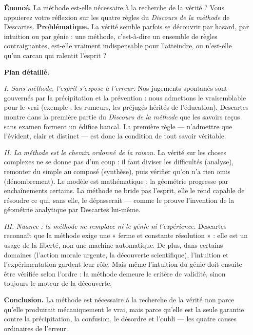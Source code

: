 \documentclass[11pt]{article}
\begin{document}
\begin{exoresolu}
\textbf{Énoncé.} La méthode est-elle nécessaire à la recherche de la vérité ? Vous appuierez votre réflexion sur les quatre règles du \emph{Discours de la méthode} de Descartes.
\tcblower
\textbf{Problématique.} La vérité semble parfois se découvrir par hasard, par intuition ou par génie : une méthode, c'est-à-dire un ensemble de règles contraignantes, est-elle vraiment indispensable pour l'atteindre, ou n'est-elle qu'un carcan qui ralentit l'esprit ?
\par
\textbf{Plan détaillé.}
\par
\emph{I. Sans méthode, l'esprit s'expose à l'erreur.} Nos jugements spontanés sont gouvernés par la précipitation et la prévention : nous admettons le vraisemblable pour le vrai (exemple : les rumeurs, les préjugés hérités de l'éducation). Descartes montre dans la première partie du \emph{Discours de la méthode} que les savoirs reçus sans examen forment un édifice bancal. La première règle — n'admettre que l'évident, clair et distinct — est donc la condition de tout savoir véritable.
\par
\emph{II. La méthode est le chemin ordonné de la raison.} La vérité sur les choses complexes ne se donne pas d'un coup : il faut diviser les difficultés (analyse), remonter du simple au composé (synthèse), puis vérifier qu'on n'a rien omis (dénombrement). Le modèle est mathématique : la géométrie progresse par enchaînements certains. La méthode ne bride pas l'esprit, elle le rend capable de résoudre ce qui, sans elle, le dépasserait — comme le prouve l'invention de la géométrie analytique par Descartes lui-même.
\par
\emph{III. Nuance : la méthode ne remplace ni le génie ni l'expérience.} Descartes reconnaît que la méthode exige une « ferme et constante résolution » : elle est un usage de la liberté, non une machine automatique. De plus, dans certains domaines (l'action morale urgente, la découverte scientifique), l'intuition et l'expérimentation gardent leur rôle. Mais même l'intuition du génie doit ensuite être vérifiée selon l'ordre : la méthode demeure le critère de validité, sinon toujours le moteur de la découverte.
\par
\textbf{Conclusion.} La méthode est nécessaire à la recherche de la vérité non parce qu'elle produirait mécaniquement le vrai, mais parce qu'elle est la seule garantie contre la précipitation, la confusion, le désordre et l'oubli — les quatre causes ordinaires de l'erreur.
\end{exoresolu}
\end{document}
